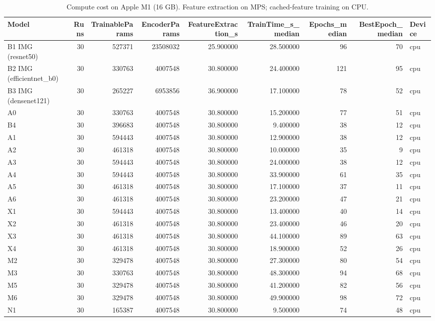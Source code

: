 \begin{table}
\caption{Compute cost on Apple M1 (16 GB). Feature extraction on MPS; cached-feature training on CPU.}
\label{tab:table8_compute}
\begin{tabular}{lrrrrrrrl}
\toprule
Model & Runs & TrainableParams & EncoderParams & FeatureExtraction\_s & TrainTime\_s\_median & Epochs\_median & BestEpoch\_median & Device \\
\midrule
B1 IMG (resnet50) & 30 & 527371 & 23508032 & 25.900000 & 28.500000 & 96 & 70 & cpu \\
B2 IMG (efficientnet\_b0) & 30 & 330763 & 4007548 & 30.800000 & 24.400000 & 121 & 95 & cpu \\
B3 IMG (densenet121) & 30 & 265227 & 6953856 & 36.900000 & 17.100000 & 78 & 52 & cpu \\
A0 & 30 & 330763 & 4007548 & 30.800000 & 15.200000 & 77 & 51 & cpu \\
B4 & 30 & 396683 & 4007548 & 30.800000 & 9.400000 & 38 & 12 & cpu \\
A1 & 30 & 594443 & 4007548 & 30.800000 & 12.900000 & 38 & 12 & cpu \\
A2 & 30 & 461318 & 4007548 & 30.800000 & 10.000000 & 35 & 9 & cpu \\
A3 & 30 & 594443 & 4007548 & 30.800000 & 24.000000 & 38 & 12 & cpu \\
A4 & 30 & 594443 & 4007548 & 30.800000 & 33.900000 & 61 & 35 & cpu \\
A5 & 30 & 461318 & 4007548 & 30.800000 & 17.100000 & 37 & 11 & cpu \\
A6 & 30 & 461318 & 4007548 & 30.800000 & 23.200000 & 47 & 21 & cpu \\
X1 & 30 & 594443 & 4007548 & 30.800000 & 13.400000 & 40 & 14 & cpu \\
X2 & 30 & 461318 & 4007548 & 30.800000 & 23.400000 & 46 & 20 & cpu \\
X3 & 30 & 461318 & 4007548 & 30.800000 & 44.100000 & 89 & 63 & cpu \\
X4 & 30 & 461318 & 4007548 & 30.800000 & 18.900000 & 52 & 26 & cpu \\
M2 & 30 & 329478 & 4007548 & 30.800000 & 27.300000 & 80 & 54 & cpu \\
M3 & 30 & 330763 & 4007548 & 30.800000 & 48.300000 & 94 & 68 & cpu \\
M5 & 30 & 329478 & 4007548 & 30.800000 & 41.200000 & 82 & 56 & cpu \\
M6 & 30 & 329478 & 4007548 & 30.800000 & 49.900000 & 98 & 72 & cpu \\
N1 & 30 & 165387 & 4007548 & 30.800000 & 9.500000 & 74 & 48 & cpu \\

\end{tabular}
\end{table}
